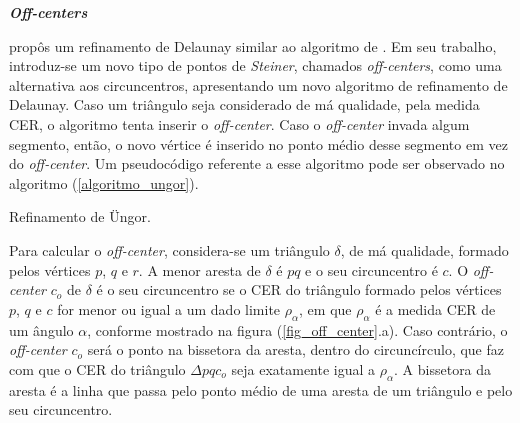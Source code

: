 \textbf {\emph{Off-centers}}
\label{cap_off_centers}

 propôs um refinamento de Delaunay similar ao algoritmo de . Em seu trabalho, introduz-se um novo tipo de pontos de {\it Steiner}, chamados {\it off-centers}, como uma alternativa aos circuncentros, apresentando um novo algoritmo de refinamento de Delaunay. Caso um triângulo seja considerado de má qualidade, pela medida CER, o algoritmo tenta inserir o \emph{off-center}. Caso o \emph{off-center} invada algum segmento, então, o novo vértice é inserido no ponto médio desse segmento em vez do \emph{off-center}. Um pseudocódigo referente a esse algoritmo pode ser observado no algoritmo (\ref{algoritmo_ungor}).

\begin{algorithm}[!ht]
\caption{Refinamento de \"Ungor.} 
\label{algoritmo_ungor}
\end{algorithm}  

Para calcular o {\it off-center}, considera-se um triângulo $\delta$, de má qualidade, formado pelos vértices $p$, $q$ e $r$. A menor aresta de $\delta$ é $pq$ e o seu circuncentro é $c$. O {\it off-center} $c_{o}$ de $\delta$ é o seu circuncentro se o CER do triângulo formado pelos vértices  $p$, $q$ e $c$ for menor ou igual a um dado limite $\rho_{\alpha}$, em que $\rho_{\alpha}$ é a medida CER de um ângulo $\alpha$, conforme mostrado na figura (\ref{fig_off_center}.a). Caso contrário, o {\it off-center} $c_{o}$ será o ponto na bissetora da aresta, dentro do circuncírculo, que faz com que o CER do triângulo $\Delta pqc_{o}$ seja exatamente igual a $\rho_{\alpha}$. A bissetora da aresta é a linha que passa pelo ponto médio de uma aresta de um triângulo e pelo seu circuncentro. 

